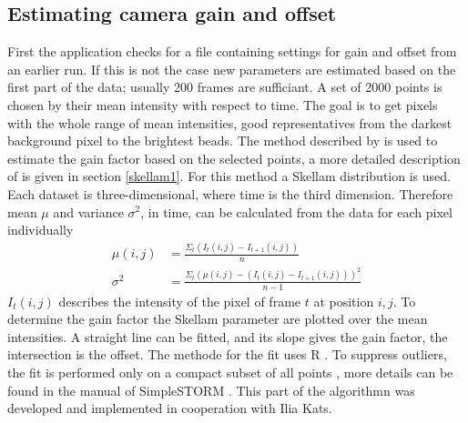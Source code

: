 \subsection{Estimating camera gain and offset}
First the application checks for a file containing settings for gain and offset from an earlier run. If this is not the case new parameters are estimated based on the first part of the data; usually 200 frames are sufficiant.\newline
A set of 2000 points is chosen by their mean intensity with respect to time. The goal is to get pixels with the whole range of mean intensities, good representatives from the darkest background pixel to the brightest beads.\newline 
The method described by \cite{skellam} is used to estimate the
gain factor based on the selected points, a more detailed description of is given in section \ref{skellam1}. For this method a Skellam distribution is used. 
Each dataset is three-dimensional, where time is the third
dimension. Therefore mean $\mu$ and variance $\sigma^2$, in time, can be calculated from
the data for each pixel individually
\begin{align}
	\mu(i,j) & = \frac{\Sigma_t(I_t(i,j)-I_{t+1}(i,j))}{n}\\
	\sigma^2 & = \frac{\Sigma_t(\mu(i,j)-(I_t(i,j)-I_{t+1}(i,j)))^2}{n-1}
\end{align} 
$I_t(i,j)$ describes the intensity of the pixel of frame $t$ at position $i,j$.
To determine the gain factor the Skellam parameter are plotted over the mean
intensities. A straight line can be fitted, and its slope gives the gain
factor, the intersection is the offset.\newline 
The methode for the fit uses R \cite{Rcite}. To suppress outliers, the fit is performed only on a compact subset of all points \cite{ilia1}, more details can be found in the manual of SimpleSTORM \cite{ilia2}. This part of the algorithmn was developed and implemented in cooperation with Ilia Kats.  
